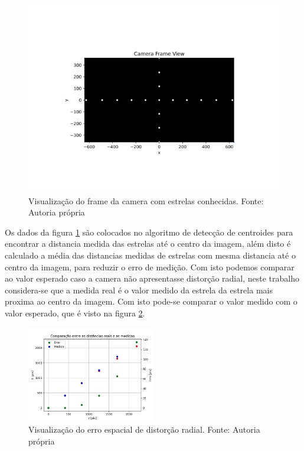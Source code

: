 \begin{figure}[H]
    \centering
    \includegraphics[width=1\textwidth]{images/Camera_conhecido.png}
    \caption{Visualização do frame da camera com estrelas conhecidas. Fonte: Autoria própria}
    \label{fig:Camera_conhecido}
\end{figure}

Os dados da figura \ref{fig:Camera_conhecido} são colocados no algoritmo de detecção de centroides para encontrar a distancia medida das estrelas até o centro da imagem,
além disto é calculado a média das distancias medidas de estrelas com mesma distancia até o centro da imagem, para reduzir o erro de medição.
Com isto podemos comparar ao valor esperado caso a camera não apresentasse distorção radial,
neste trabalho considera-se que a medida real é o valor medido da estrela da estrela mais proxima ao centro da imagem.
Com isto pode-se comparar o valor medido com o valor esperado, que é visto na figura \ref{fig:comparacoes_de_erro}.

\begin{figure}[H]
    \centering
    \includegraphics[width=0.5\textwidth]{images/comparacoes_de_erro.png}
    \caption{Visualização do erro espacial de distorção radial. Fonte: Autoria própria}
    \label{fig:comparacoes_de_erro}
\end{figure}

